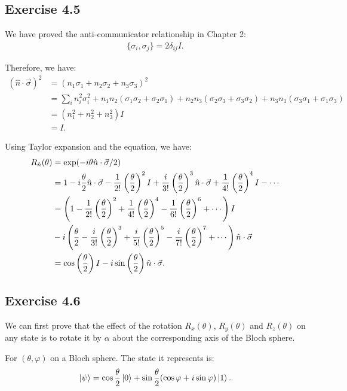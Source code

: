 \subsection*{Exercise 4.5}
We have proved the anti-communicator relationship in Chapter 2:
\begin{align}
    \{\sigma_i,\sigma_j\}=2\delta_{ij}I.
\end{align}

Therefore, we have:
\begin{align}
    (\hat n \cdot \vec\sigma)^2&=(n_1\sigma_1+n_2\sigma_2+n_3\sigma_3)^2\\
    &=\sum_i n_i^2\sigma_i^2+n_1n_2(\sigma_1\sigma_2+\sigma_2\sigma_1)+n_2n_3(\sigma_2\sigma_3+\sigma_3\sigma_2)+n_3n_1(\sigma_3\sigma_1+\sigma_1\sigma_3)\\
    &=(n_1^2+n_2^2+n_3^2)I\\
    &=I.
\end{align}

Using Taylor expansion and the equation, we have:
\begin{align}
    R_{\hat n}(\theta)&=\exp(-i\theta\hat n \cdot \vec\sigma/2)\\
    &=1-i\frac{\theta}{2}\hat n\cdot \vec \sigma-\frac{1}{2!}\left(\frac{\theta}{2}\right)^2I+\frac{i}{3!}\left(\frac{\theta}{2}\right)^3\hat n\cdot \vec \sigma+\frac{1}{4!}\left(\frac{\theta}{2}\right)^4I-\cdots\\
    &=\left(1-\frac{1}{2!}\left(\frac{\theta}{2}\right)^2+\frac{1}{4!}\left(\frac{\theta}{2}\right)^4-\frac{1}{6!}\left(\frac{\theta}{2}\right)^6+\cdots\right)I\notag\\
    &-i\left(\frac{\theta}{2}-\frac{i}{3!}\left(\frac{\theta}{2}\right)^3+\frac{i}{5!}\left(\frac{\theta}{2}\right)^5-\frac{i}{7!}\left(\frac{\theta}{2}\right)^7+\cdots\right)\hat n\cdot \vec \sigma\\
    &=\cos\left(\frac{\theta}{2}\right)I-i\sin\left(\frac{\theta}{2}\right)\hat n \cdot \vec \sigma.
\end{align}

\subsection*{Exercise 4.6}

We can first prove that the effect of the rotation $R_x(\theta)$, $R_y(\theta)$ and $R_z(\theta)$ on any state is to rotate it by $\alpha$ about the corresponding axis of the Bloch sphere.

For $(\theta,\varphi)$ on a Bloch sphere. The state it represents is:
\begin{align}
    \ket{\psi}=\cos\frac{\theta}{2}\ket{0}+\sin\frac{\theta}{2}(\cos\varphi+i\sin\varphi)\ket{1}.
\end{align}

